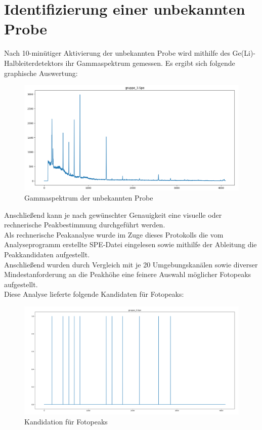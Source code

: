 \documentclass[12pt,german]{article}
\begin{document}
    \section{Identifizierung einer unbekannten Probe}
    Nach 10-minütiger Aktivierung der unbekannten Probe wird mithilfe des Ge(Li)-Halbleiterdetektors ihr Gammaspektrum gemessen. Es ergibt sich folgende graphische Auswertung: \\
    \begin{figure}[H]
        \centering
        \includegraphics[width=1.0\textwidth]{pics/gruppe_3.png}
        \caption{Gammaspektrum der unbekannten Probe}
    \end{figure}
    Anschließend kann je nach gewünschter Genauigkeit eine visuelle oder rechnerische Peakbestimmung durchgeführt werden. \\
    Als rechnerische Peakanalyse wurde im Zuge dieses Protokolls die vom Analyseprogramm erstellte SPE-Datei eingelesen sowie mithilfe der Ableitung die Peakkandidaten aufgestellt. \\
    Anschließend wurden durch Vergleich mit je 20 Umgebungskanälen sowie diverser Mindestanforderung an die Peakhöhe eine feinere Auswahl möglicher Fotopeaks aufgestellt. \\
    Diese Analyse lieferte folgende Kandidaten für Fotopeaks: \\
    \begin{figure}[H]
        \centering
        \includegraphics[width=1.0\textwidth]{pics/gruppe_3_peaks.png}
        \caption{Kandidation für Fotopeaks}
    \end{figure}
    
\end{document}
